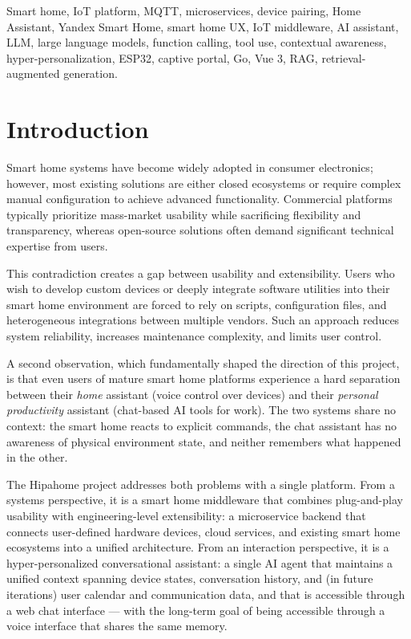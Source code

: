 \documentclass[a4paper,12pt]{article}
\begin{document}
Smart home, IoT platform, MQTT, microservices, device pairing, Home Assistant, Yandex Smart Home, smart home UX, IoT middleware, AI assistant, LLM, large language models, function calling, tool use, contextual awareness, hyper-personalization, ESP32, captive portal, Go, Vue 3, RAG, retrieval-augmented generation.

\newpage

\section{Introduction}

Smart home systems have become widely adopted in consumer electronics; however, most existing solutions are either closed ecosystems or require complex manual configuration to achieve advanced functionality. Commercial platforms typically prioritize mass-market usability while sacrificing flexibility and transparency, whereas open-source solutions often demand significant technical expertise from users.

This contradiction creates a gap between usability and extensibility. Users who wish to develop custom devices or deeply integrate software utilities into their smart home environment are forced to rely on scripts, configuration files, and heterogeneous integrations between multiple vendors. Such an approach reduces system reliability, increases maintenance complexity, and limits user control.

A second observation, which fundamentally shaped the direction of this project, is that even users of mature smart home platforms experience a hard separation between their \emph{home} assistant (voice control over devices) and their \emph{personal productivity} assistant (chat-based AI tools for work). The two systems share no context: the smart home reacts to explicit commands, the chat assistant has no awareness of physical environment state, and neither remembers what happened in the other.

The Hipahome project addresses both problems with a single platform. From a systems perspective, it is a smart home middleware that combines plug-and-play usability with engineering-level extensibility: a microservice backend that connects user-defined hardware devices, cloud services, and existing smart home ecosystems into a unified architecture. From an interaction perspective, it is a hyper-personalized conversational assistant: a single AI agent that maintains a unified context spanning device states, conversation history, and (in future iterations) user calendar and communication data, and that is accessible through a web chat interface --- with the long-term goal of being accessible through a voice interface that shares the same memory.
\end{document}
